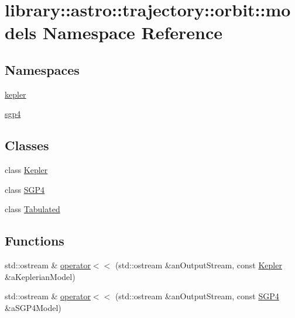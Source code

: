 \hypertarget{namespacelibrary_1_1astro_1_1trajectory_1_1orbit_1_1models}{}\section{library\+:\+:astro\+:\+:trajectory\+:\+:orbit\+:\+:models Namespace Reference}
\label{namespacelibrary_1_1astro_1_1trajectory_1_1orbit_1_1models}
\subsection*{Namespaces}
\begin{DoxyCompactItemize}
\item 
 \hyperlink{namespacelibrary_1_1astro_1_1trajectory_1_1orbit_1_1models_1_1kepler}{kepler}
\item 
 \hyperlink{namespacelibrary_1_1astro_1_1trajectory_1_1orbit_1_1models_1_1sgp4}{sgp4}
\end{DoxyCompactItemize}
\subsection*{Classes}
\begin{DoxyCompactItemize}
\item 
class \hyperlink{classlibrary_1_1astro_1_1trajectory_1_1orbit_1_1models_1_1_kepler}{Kepler}
\item 
class \hyperlink{classlibrary_1_1astro_1_1trajectory_1_1orbit_1_1models_1_1_s_g_p4}{S\+G\+P4}
\item 
class \hyperlink{classlibrary_1_1astro_1_1trajectory_1_1orbit_1_1models_1_1_tabulated}{Tabulated}
\end{DoxyCompactItemize}
\subsection*{Functions}
\begin{DoxyCompactItemize}
\item 
std\+::ostream \& \hyperlink{namespacelibrary_1_1astro_1_1trajectory_1_1orbit_1_1models_add30984ea41b81d41ec9eaccededb02b}{operator$<$$<$} (std\+::ostream \&an\+Output\+Stream, const \hyperlink{classlibrary_1_1astro_1_1trajectory_1_1orbit_1_1models_1_1_kepler}{Kepler} \&a\+Keplerian\+Model)
\item 
std\+::ostream \& \hyperlink{namespacelibrary_1_1astro_1_1trajectory_1_1orbit_1_1models_afdb7df09fa31e9fa56cecb5b23a3c08f}{operator$<$$<$} (std\+::ostream \&an\+Output\+Stream, const \hyperlink{classlibrary_1_1astro_1_1trajectory_1_1orbit_1_1models_1_1_s_g_p4}{S\+G\+P4} \&a\+S\+G\+P4\+Model)
\end{DoxyCompactItemize}


